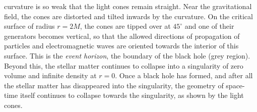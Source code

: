 \documentclass[12pt]{article}
\begin{document}
curvature is so weak that the light cones remain straight. Near the
gravitational field, the cones are distorted and tilted inwards by the curvature. On
the critical surface of radius $r=2M$, the cones are tipped over at 
$45^{\circ}$
and one of their generators becomes vertical, so that the allowed directions of
propagation of particles and electromagnetic waves are oriented towards 
the interior of this surface. This is the {\it event horizon}, the boundary of the
black hole (grey region). Beyond this, the stellar matter continues to
collapse into a singularity of zero volume and infinite density at $r=0$. Once
a black hole has formed, and after all the stellar matter has disappeared into
the singularity, the geometry of space-time itself continues to collapse
towards the singularity, as shown by the light cones. 
\end{document}
